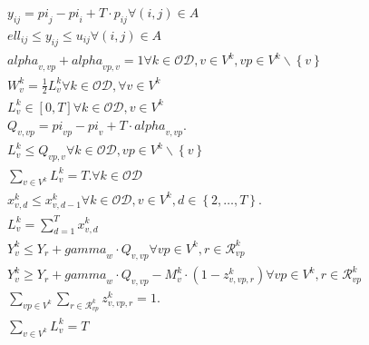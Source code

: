 \begin{align}
  & y_{i j} = \mathit{pi}_{j} - \mathit{pi}_{i} + T \cdot p_{i j} \forall \left(i , j\right) \in A \tag{eq\_0012} \\
  & \mathit{ell}_{i j} \leq y_{i j} \leq u_{i j} \forall \left(i , j\right) \in A \tag{eq\_0013} \\
  & \mathit{alpha}_{v , vp} + \mathit{alpha}_{vp , v} = 1 \forall k \in \mathcal{OD} , v \in V^{k} , vp \in V^{k} \backslash \left\{v\right\} \tag{eq\_0016} \\
  & W_{v}^{k} = \frac{1}{2} L_{v}^{k} \forall k \in \mathcal{OD} , \forall v \in V^{k} \tag{eq\_0017} \\
  & L_{v}^{k} \in \left[0 , T\right] \forall k \in \mathcal{OD} , v \in V^{k} \tag{eq\_0019} \\
  & Q_{v , vp} = \mathit{pi}_{vp} - \mathit{pi}_{v} + T \cdot \mathit{alpha}_{v , vp} . \tag{eq\_0025} \\
  & L_{v}^{k} \leq Q_{vp , v} \forall k \in \mathcal{OD} , vp \in V^{k} \backslash \left\{v\right\} \tag{eq\_0026} \\
  & \sum_{v \in V^{k}} L_{v}^{k} = T . \forall k \in \mathcal{OD} \tag{eq\_0027} \\
  & x_{v , d}^{k} \leq x_{v , d - 1}^{k} \forall k \in \mathcal{OD} , v \in V^{k} , d \in \left\{2 , \ldots , T\right\} . \tag{eq\_0036} \\
  & L_{v}^{k} = \sum_{d = 1}^{T} x_{v , d}^{k} \tag{eq\_0037\_a} \\
  & Y_{v}^{k} \leq Y_{r} + \mathit{gamma}_{w} \cdot Q_{v , vp} \forall vp \in V^{k} , r \in \mathcal{R}_{vp}^{k} \tag{eq\_0043} \\
  & Y_{v}^{k} \geq Y_{r} + \mathit{gamma}_{w} \cdot Q_{v , vp} - M_{v}^{k} \cdot \left(1 - z_{v , vp , r}^{k}\right) \forall vp \in V^{k} , r \in \mathcal{R}_{vp}^{k} \tag{eq\_0044} \\
  & \sum_{vp \in V^{k}} \underset{r \in \mathcal{R}_{vp}^{k}}{\sum} z_{v , vp , r}^{k} = 1 . \tag{eq\_0045} \\
  & \sum_{v \in V^{k}} L_{v}^{k} = T \tag{eq\_0049} \\
\end{align}
